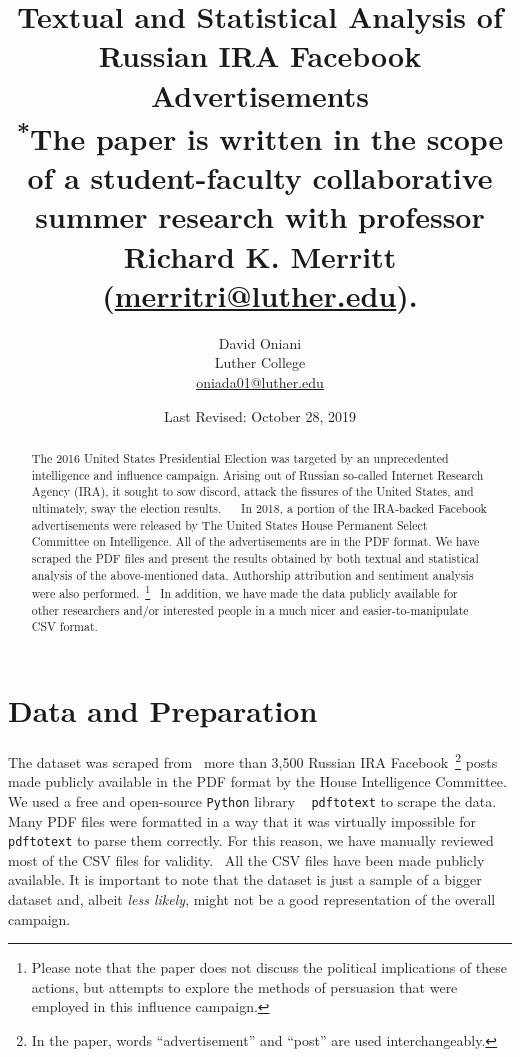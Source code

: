 \documentclass{article}
\author{David Oniani\\
        Luther College\\
        \href{mailto:oniada01@luther.edu}{oniada01@luther.edu}}
\title{\textbf{Textual and Statistical Analysis of Russian IRA Facebook Advertisements}\\
       \medskip
       \small \textsuperscript{*}The paper is written in the scope of a
       student-faculty collaborative\\ summer research with professor Richard
       K. Merritt (\href{mailto:merritri@luther.edu}{merritri@luther.edu}).}
\date{Last Revised: October 28, 2019}
\begin{document}
\maketitle


\begin{abstract}
\noindent The 2016 United States Presidential Election was targeted by an
unprecedented intelligence and influence campaign. Arising out of Russian
so-called Internet Research Agency (IRA), it sought to sow discord, attack
the fissures of the United States, and ultimately, sway the election results.
~\cite{ira2016}~\cite{ira2016data} In 2018, a portion of the IRA-backed
Facebook advertisements were released by The United States House Permanent
Select Committee on Intelligence. All of the advertisements are in the PDF
format. We have scraped the PDF files and present the results obtained by both
textual and statistical analysis of the above-mentioned data. Authorship
attribution and sentiment analysis were also performed.~\footnote{Please note
that the paper does not discuss the political implications of these actions,
but attempts to explore the methods of persuasion that were employed in this
influence campaign.}~\cite{ira2016csvdata} In addition, we have made the data
publicly available for other researchers and/or interested people in a much
nicer and easier-to-manipulate CSV format.
\end{abstract}


\section*{\centering Data and Preparation}

The dataset was scraped from~\cite{ira2016data} more than 3,500 Russian IRA
Facebook~\footnote{In the paper, words ``advertisement'' and ``post'' are used
interchangeably.} posts made publicly available in the PDF format by the House
Intelligence Committee. We used a free and open-source \texttt{Python} library
~\cite{pdftotext} \texttt{pdftotext} to scrape the data. Many PDF files were
formatted in a way that it was virtually impossible for \texttt{pdftotext} to
parse them correctly. For this reason, we have manually reviewed most of the
CSV files for validity.~\cite{ira2016csvdata} All the CSV files have been made
publicly available. It is important to note that the dataset is just a sample
of a bigger dataset and, albeit \textit{less likely}, might not be a good
representation of the overall campaign.
\end{document}
